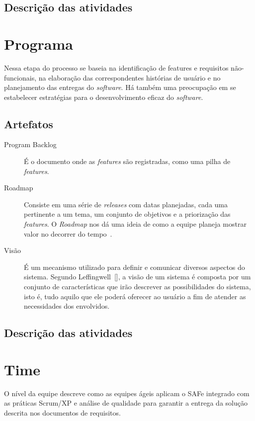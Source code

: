\subsection{Descrição das atividades}

\section{Programa}
Nessa etapa do processo se baseia na identificação de features e requisitos não-funcionais, na elaboração das correspondentes histórias de usuário e no planejamento das entregas do \textit{software}. Há também uma preocupação em se estabelecer estratégias para o desenvolvimento eficaz do \textit{software}.

\subsection{Artefatos}
\begin{description}
\item[Program Backlog] É o documento onde as \textit{features} são registradas, como uma pilha de \textit{features}.
\item[Roadmap] Consiste em uma série de \textit{releases} com datas planejadas, cada uma pertinente a um tema, um conjunto de objetivos e a priorização das \textit{features}. O \textit{Roadmap} nos dá uma ideia de como a equipe planeja mostrar valor no decorrer do tempo~\cite{leffingwell}.
\item[Visão] É um mecanismo utilizado para definir e comunicar diversos aspectos do sistema. Segundo Leffingwell~[\citeyear{leffingwell}], a visão de um sistema é composta por um conjunto de características que irão descrever as possibilidades do sistema, isto é, tudo aquilo que ele poderá oferecer ao usuário a fim de atender as necessidades dos envolvidos.
\end{description}

\subsection{Descrição das atividades}

\section{Time}
O nível da equipe descreve como as equipes ágeis aplicam o SAFe integrado com as práticas Scrum/XP e análise de qualidade para garantir a entrega da solução descrita nos documentos de requisitos.

